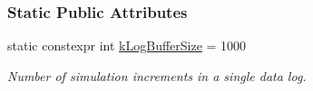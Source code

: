 \subsubsection*{Static Public Attributes}
\begin{DoxyCompactItemize}
\item 
\mbox{\label{classosse_1_1collaborate_1_1_node_ab547be97379bd04ed560971c0fd4f375}} 
static constexpr int \hyperlink{classosse_1_1collaborate_1_1_node_ab547be97379bd04ed560971c0fd4f375}{k\+Log\+Buffer\+Size} = 1000
\begin{DoxyCompactList}\small\item\em Number of simulation increments in a single data log. \end{DoxyCompactList}\end{DoxyCompactItemize}
